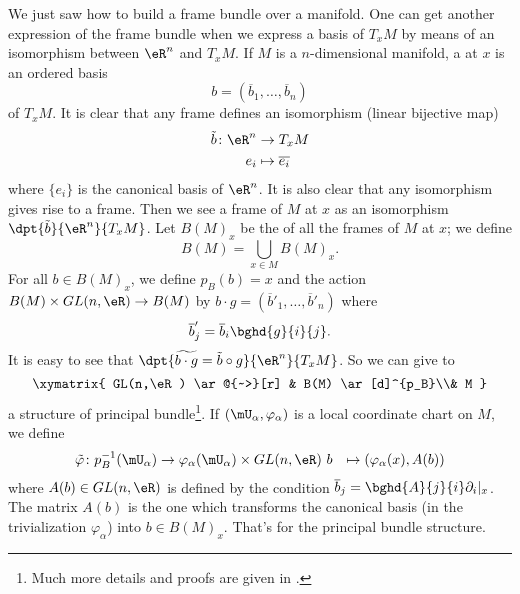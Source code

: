 We just saw how to build a frame bundle over a manifold. One can get another expression of the frame bundle when we express a basis of $T_xM$ by means of an isomorphism between $\eR^n$ and $T_xM$. If $M$ is a $n$-dimensional manifold, a  at $x$ is an ordered basis
\[
	b=(\overline{ b }_1,\ldots,\overline{ b }_n)
\]
of $T_xM$. It is clear that any frame defines an isomorphism (linear bijective map)
\begin{equation}
	\begin{aligned}
		\tilde{b}\colon\eR^n & \to T_xM                 \\
		e_i                  & \mapsto \overline{ e_i }
	\end{aligned}
\end{equation}
where $\{e_i\}$ is the canonical basis of $\eR^n$. It is also clear that any isomorphism gives rise to a frame. Then we see a frame of $M$ at $x$ as an isomorphism $\dpt{\tilde{b}}{\eR^n}{T_xM}$. Let $B(M)_x$ be the of all the frames of $M$ at $x$; we define
\[
	B(M)=\bigcup_{x\in M}B(M)_x.
\]
For all $b\in B(M)_x$, we define $p_B(b)=x$ and the action $B(M)\times GL(n,\eR)\to B(M)$ by $b\cdot g=(\overline{ b }'_1,\ldots,\overline{ b }'_n)$ where
\begin{equation}
	\overline{ b }'_j=\overline{ b }_i\bghd{g}{i}{j}.
\end{equation}
It is easy to see that $\dpt{\widetilde{b\cdot g}=\tilde{b}\circ g}{\eR^n}{T_xM}$. So we can give to
\begin{equation}
	\xymatrix{
		GL(n,\eR)  \ar@{~>}[r] & B(M) \ar[d]^{p_B}\\& M
	}
\end{equation}
a structure of principal bundle\footnote{Much more details and proofs are given in \cite{Naber}.}. If $(\mU_{\alpha},\varphi_{\alpha})$ is a local coordinate chart on $M$, we define
\begin{equation}
	\begin{aligned}
		\tilde{\varphi} \colon p_B^{-1}(\mU_{\alpha}) & \to \varphi_{\alpha}(\mU_{\alpha})\times GL(n,\eR)\
		b                                             & \mapsto (\varphi_{\alpha}(x),A(b))
	\end{aligned}
\end{equation}
where $A(b)\in GL(n,\eR)$ is defined by the condition $\overline{ b }_j=\bghd{A}{j}{i}\partial_i|_x$. The matrix $A(b)$ is the one which transforms the canonical basis (in the trivialization $\varphi_{\alpha}$) into $b\in B(M)_x$. That's for the principal bundle structure.

